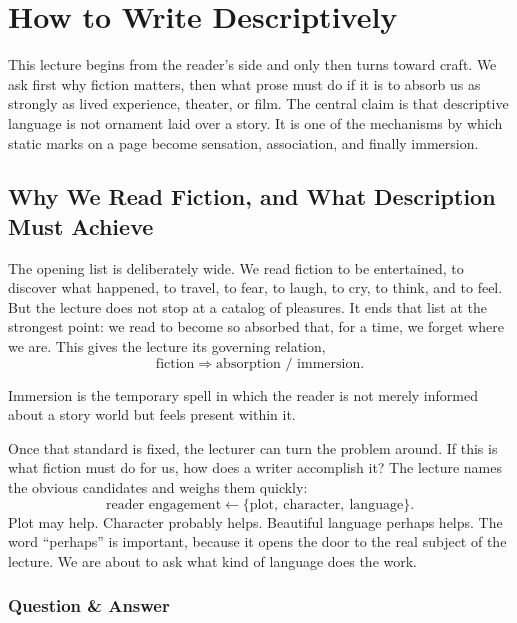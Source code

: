 \chapter{How to Write Descriptively}

This lecture begins from the reader's side and only then turns toward craft. We ask first why fiction matters, then what prose must do if it is to absorb us as strongly as lived experience, theater, or film. The central claim is that descriptive language is not ornament laid over a story. It is one of the mechanisms by which static marks on a page become sensation, association, and finally immersion.

\section{Why We Read Fiction, and What Description Must Achieve}

The opening list is deliberately wide. We read fiction to be entertained, to discover what happened, to travel, to fear, to laugh, to cry, to think, and to feel. But the lecture does not stop at a catalog of pleasures. It ends that list at the strongest point: we read to become so absorbed that, for a time, we forget where we are. This gives the lecture its governing relation,
\begin{equation}
\text{fiction} \Rightarrow \text{absorption / immersion}.
\end{equation}

\begin{definition}
Immersion is the temporary spell in which the reader is not merely informed about a story world but feels present within it.
\end{definition}

Once that standard is fixed, the lecturer can turn the problem around. If this is what fiction must do for us, how does a writer accomplish it? The lecture names the obvious candidates and weighs them quickly:
\begin{equation}
\text{reader engagement} \leftarrow \{\text{plot},\ \text{character},\ \text{language}\}.
\end{equation}
Plot may help. Character probably helps. Beautiful language perhaps helps. The word ``perhaps'' is important, because it opens the door to the real subject of the lecture. We are about to ask what kind of language does the work.

\subsection{Question \& Answer}

